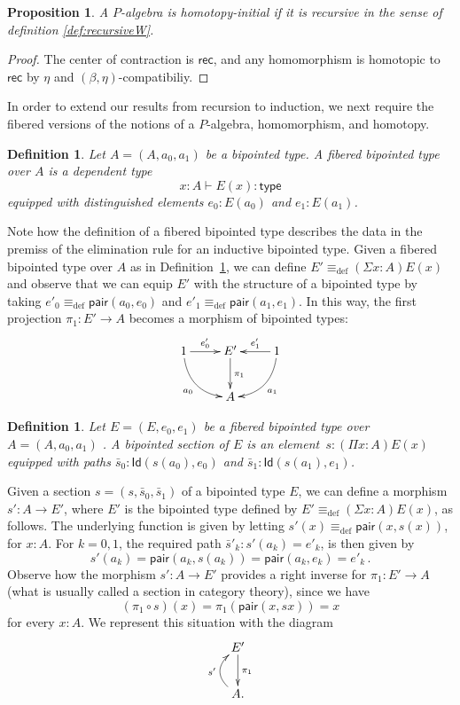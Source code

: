 \documentclass[reqno,10pt,a4paper,oneside]{amsart}
\numberwithin{equation}{section}
\theoremstyle{mythm}
\newtheorem{proposition}[theorem]{Proposition}
\theoremstyle{mydef}
\newtheorem{definition}[theorem]{Definition}
\theoremstyle{myrmk}
\newcommand{\ie}{\text{i.e.\ }}
\newcommand{\deq}{\equiv}
\newcommand{\defeq}{\deq_{\mathrm{def}}}
\newcommand{\co}{\colon}
\newcommand{\type}{\mathsf{type}}
\newcommand{\pair}{\mathsf{pair}}
\newcommand{\Id}{\mathsf{Id}}
\newcommand{\rec}{\mathsf{rec}}
\begin{document}
\begin{proposition}\label{prop:Wrec2hinit}
A $P$-algebra is homotopy-initial if it is recursive in the sense of definition \ref{def:recursiveW}.
\end{proposition}

\begin{proof}
The center of contraction is $\rec$, and any homomorphism is homotopic to $\rec$ by $\eta$ and $(\beta,\eta)$-compatibiliy.
\end{proof}


In order to extend our results from recursion to induction, we next require the fibered versions of the notions of a $P$-algebra, homomorphism, and homotopy.

\begin{definition} \label{def:fibbipointed}
Let $A = (A, a_0, a_1)$ be a bipointed type. A \emph{fibered bipointed type} over $A$ is a dependent type
\[
x : A \vdash E(x) \co \type
\]
equipped with distinguished elements $e_0 \co E(a_0)$ and $e_1 \co E(a_1)$.
\end{definition}

Note how the definition of a fibered bipointed type describes the data in the premiss of the elimination rule for an inductive bipointed type. Given a 
fibered bipointed type over $A$ as in Definition~\ref{def:fibbipointed}, we can define $E' \defeq (\Sigma x : A) E(x)$ and observe that
we can equip $E'$ with the structure of a bipointed type by taking $e'_0 \defeq \pair(a_0, e_0)$ and $e'_1 \defeq \pair(a_1, e_1)$.
In this way, the first projection $\pi_1 \co E' \to A$ becomes a morphism of bipointed types:
\[
\xymatrix{
1 \ar@/_1pc/[dr]_{a_0} \ar[r]^-{e'_0} & E' \ar[d]^{\pi_1} & 1 \ar[l]_-{e'_1} \ar@/^1pc/[dl]^{a_1} \\ 
 & A & }
 \]

\begin{definition} \label{def:fibsection} Let $E = (E, e_0, e_1)$ be a fibered bipointed type over~$A = (A, a_0, a_1)$ . 
A \emph{bipointed section} of $E$ is an element~$s \co (\Pi x \co A) E(x)$ equipped with paths $\bar{s}_0 \co \Id(s(a_0), e_0)$ and $\bar{s}_1 \co \Id(s(a_1), e_1)$. 
\end{definition} 

Given a section $s = (s, \bar{s}_0, \bar{s}_1)$ of a bipointed type $E$, we can define a morphism $s' \co A \to E'$, where $E'$ is the
bipointed type defined by $E' \defeq (\Sigma x :A) E(x)$, as follows.
The underlying function is given by letting $s'(x) \defeq \pair(x, s(x))$, for $x : A$. For $k = 0, 1$, the required path $\bar{s}'_k \co s'(a_k) = e'_k$,
is then given by
\[
s'(a_k) = \pair(a_k, s(a_k)) =  \pair(a_k, e_k) = e'_k \, .
\]
Observe how the morphism $s' \co A \to E'$ provides a right inverse for $\pi_1 \co E' \to A$ (\ie what is usually called a section in 
category theory), since we have
\[
(\pi_1 \circ s)(x) = \pi_1 (\pair(x, sx)) = x 
\]
for every $x \co A$. We represent this situation with the diagram
\[
\xymatrix{
E' \ar[d]^{\pi_1} \\
A . \ar@/^1.2pc/[u]^{s'} }
\]
\end{document}
